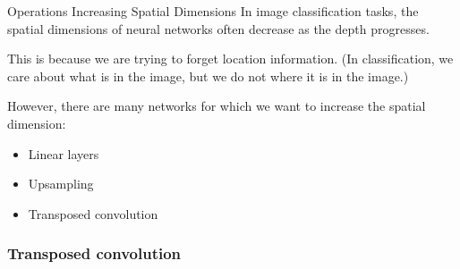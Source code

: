\begin{frame}[allowframebreaks]

\begin{myconceptblock}{8.11}{Operations Increasing Spatial Dimensions}
    In image classification tasks, the spatial dimensions of neural networks often decrease as the depth progresses.

    This is because we are trying to forget location information. (In classification, we care about what is in the image, but we do not where it is in the image.)

    However, there are many networks for which we want to increase the spatial dimension:

    \begin{itemize}
        \item Linear layers
        \item Upsampling
        \item Transposed convolution
    \end{itemize}
\end{myconceptblock}

\end{frame}

\subsubsection{Transposed convolution}

